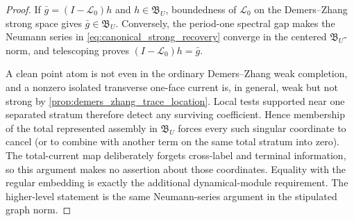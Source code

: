 \documentclass[11pt]{amsart}
\theoremstyle{compactplain}
\theoremstyle{compactdefinition}
\theoremstyle{compactremark}
\newcommand{\Ltransfer}{\mathscr L}
\begin{document}
\begin{proof}
If \(\bar g=(I-\Ltransfer_0)h\) and
\(h\in\mathfrak B_U\), boundedness of \(\Ltransfer_0\) on the
Demers--Zhang strong space gives
\(\bar g\in\mathfrak B_U\).  Conversely, the period-one spectral gap makes the
Neumann series in \eqref{eq:canonical_strong_recovery} converge in the
centered \(\mathfrak B_U\)-norm, and telescoping proves
\((I-\Ltransfer_0)h=\bar g\).

A clean point atom is not even in the ordinary Demers--Zhang weak completion,
and a nonzero isolated transverse one-face current is, in general, weak but
not strong by \cref{prop:demers_zhang_trace_location}.  Local tests supported
near one separated stratum therefore detect any surviving coefficient.
Hence membership of the total represented assembly in \(\mathfrak B_U\)
forces every such singular coordinate to cancel (or to combine with another
term on the same total stratum into zero).  The total-current map deliberately
forgets cross-label and terminal information, so this argument makes no
assertion about those coordinates.  Equality with the regular embedding is
exactly the additional dynamical-module requirement.  The higher-level
statement is the same Neumann-series argument in the stipulated graph norm.
\end{proof}
\end{document}
